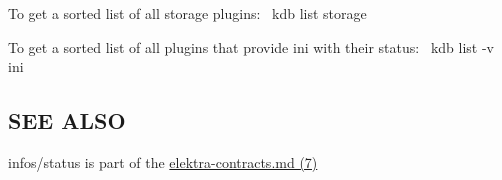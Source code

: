 To get a sorted list of all storage plugins\+:~\newline
 {\ttfamily kdb list storage}

To get a sorted list of all plugins that provide {\ttfamily ini} with their status\+:~\newline
 {\ttfamily kdb list -\/v ini}

\subsection*{S\+EE A\+L\+SO}


\begin{DoxyItemize}
\item {\ttfamily infos/status} is part of the \hyperlink{doc_help_elektra-contracts_md}{elektra-\/contracts.md (7)} 
\end{DoxyItemize}